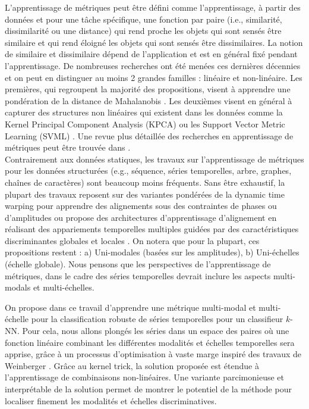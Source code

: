 L'apprentissage de métriques peut être défini comme l'apprentissage, à partir des données et pour une tâche spécifique, une fonction par paire (i.e., similarité, dissimilarité ou une distance) qui rend proche les objets qui sont sensés être similaire et qui rend éloigné les objets qui sont sensés être dissimilaires. La notion de similaire et dissimilaire dépend de l'application et est en général fixé pendant l'apprentissage. De nombreuses recherches ont été menées ces dernières décennies et on peut en distinguer au moins 2 grandes familles : linéaire et non-linéaire. Les premières, qui regroupent la majorité des propositions, visent à apprendre une pondération de la distance de Mahalanobis \cite{Weinberger2009}. Les deuxièmes visent en général à capturer des structures non linéaires qui existent dans les données comme la Kernel Principal Component Analysis (KPCA) \cite{Zhang2010,Chatpatanasiri2010} ou les Support Vector Metric Learning (SVML) \cite{Xu2012}. Une revue plus détaillée des recherches en apprentissage de métriques peut être trouvée dans \cite{Bellet2013}. \\
Contrairement aux données statiques, les travaux sur l'apprentissage de métriques pour les données structurées (e.g., séquence, séries temporelles, arbre, graphes, chaînes de caractères) sont beaucoup moins fréquents. Sans être exhaustif, la plupart des travaux reposent sur des variantes pondérées de la dynamic time warping pour apprendre des alignements sous des contraintes de phases ou d'amplitudes \cite{Reyes2011,Jeong2011,ZhangX.-L.Z.-G.Luo2014,Mei2015} ou propose des architectures d'apprentissage d'alignement en réalisant des appariements temporelles multiples guidées par des caractéristiques discriminantes globales et locales \cite{Frambourg2013a}. On notera que pour la plupart, ces propositions restent : a) Uni-modales (basées sur les amplitudes), b) Uni-échelles (échelle globale). Nous pensons que les perspectives de l'apprentissage de métriques, dans le cadre des séries temporelles devrait inclure les aspects multi-modals et multi-échelles.

On propose dans ce travail d'apprendre une métrique multi-modal et multi-échelle pour la classification robuste de séries temporelles pour un classifieur $k$-NN. Pour cela, nous allons plongés les séries dans un espace des paires où une fonction linéaire combinant les différentes modalités et échelles temporelles sera apprise, grâce à un processus d'optimisation à vaste marge inspiré des travaux de Weinberger \cite{Weinberger2009}. Grâce au kernel trick, la solution proposée est étendue à l'apprentissage de combinaisons non-linéaires. Une variante parcimonieuse et interprétable de la solution permet de montrer le potentiel de la méthode pour localiser finement les modalités et échelles discriminatives.

